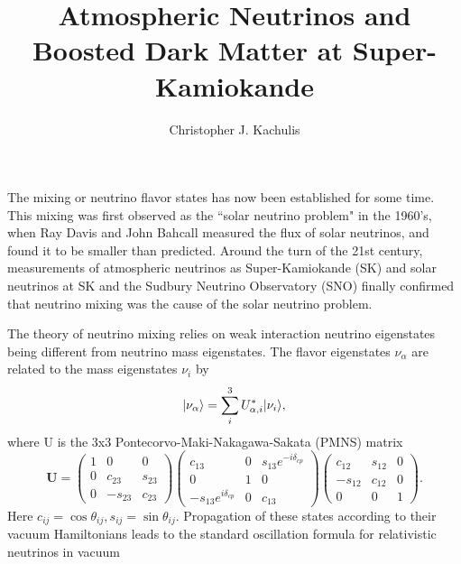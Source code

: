 \documentclass[12pt,oneside,openright]{article}
\begin{document}
\pagestyle{plain}


\setcounter{page}{1}


\title{\bf Atmospheric Neutrinos and Boosted Dark Matter at Super-Kamiokande}
\author{Christopher J. Kachulis}
\maketitle

The mixing or neutrino flavor states has now been established for some time.  This mixing was first observed as the ``solar neutrino problem" in the 1960's, when Ray Davis and John Bahcall measured the flux of solar neutrinos, and found it to be smaller than predicted.  Around the turn of the 21st century, measurements of atmospheric neutrinos as Super-Kamiokande (SK) and solar neutrinos at SK and the Sudbury Neutrino Observatory (SNO) finally confirmed that neutrino mixing was the cause of the solar neutrino problem.\par
The theory of neutrino mixing relies on weak interaction neutrino eigenstates being different from neutrino mass eigenstates.  The flavor eigenstates $\nu_\alpha$ are related to the mass eigenstates $\nu_i$ by
\begin{equation}
\lvert \nu_{\alpha}\rangle=\sum_i^3 U_{\alpha,i}^* \lvert \nu_i\rangle,
\label{eqn:flav-mass}
\end{equation}
where U is the 3x3 Pontecorvo-Maki-Nakagawa-Sakata (PMNS) matrix
\begin{equation}
\textbf{U}=\begin{pmatrix}
1 & 0 & 0\\
0 & c_{23} & s_{23} \\
0 & -s_{23} & c_{23} \end{pmatrix} 
\begin{pmatrix}
c_{13} & 0 & s_{13}e^{-i\delta_{cp}}\\
0 & 1 & 0 \\
-s_{13}e^{i\delta_{cp}} & 0 & c_{13} \end{pmatrix}
\begin{pmatrix}
c_{12} & s_{12} & 0\\
-s_{12} & c_{12} & 0 \\
0 & 0 & 1 \end{pmatrix}.
\label{eqn:pmns}
\end{equation}
%
%
Here $c_{ij}=\cos{\theta_{ij}} , s_{ij}=\sin{\theta_{ij}}$.  Propagation of these states according to their vacuum Hamiltonians leads to the standard oscillation formula for relativistic neutrinos in vacuum
\end{document}
